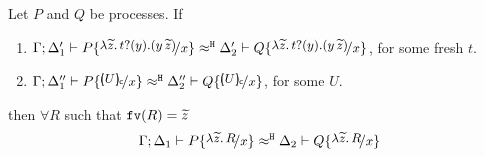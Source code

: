 \begin{lemma}
	\label{app:lem:proc_subst}
	Let $P$ and $Q$ be processes. If 
%
	\begin{enumerate}
		\item	$\horel{\Gamma}{\Delta_1'}{P \subst{\auxtr{t}}{x}}{\hwb}{\Delta_2'}{Q \subst{\auxtr{t}}{x}}$,
				for some fresh $t$.

		\item	$\horel{\Gamma}{\Delta_1''}{P \subst{\omapchar{U}}{x}}{\hwb}{\Delta_2''}{Q \subst{\omapchar{U}}{x}}$,
				for some $U$.
	\end{enumerate}
%
	then $\forall R$ such that $\mathtt{fv}(R) = \widetilde{z}$
\[
	\horel{\Gamma}{\Delta_1}{P \subst{\abs{\widetilde{z}}{R}}{x}}{\hwb}{\Delta_2}{Q \subst{\abs{\widetilde{z}}{R}}{x}}
\]
\end{lemma}


